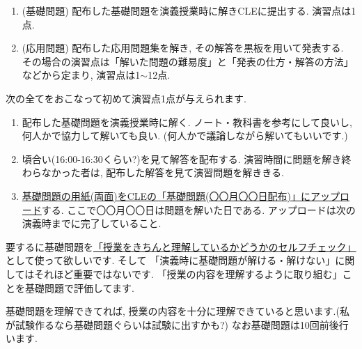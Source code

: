 \documentclass[dvipdfmx,a4paper,11pt]{article}
\theoremstyle{definition}
\begin{document}
\medskip
{}

\begin{enumerate}
  \setlength{\parskip}{0cm} 
  \setlength{\itemsep}{0cm} 
\item (基礎問題) 配布した基礎問題を演義授業時に解きCLEに提出する. 演習点は1点.
\item (応用問題) 配布した応用問題集を解き, その解答を黒板を用いて発表する. その場合の演習点は「解いた問題の難易度」と「発表の仕方・解答の方法」などから定まり, 演習点は1$\sim$12点. 
\end{enumerate}



\medskip
{}

次の全てをおこなって初めて演習点1点が与えられます. 
\begin{enumerate}[label=\textbf{手順}\arabic*.]
  \setlength{\parskip}{0cm} 
  \setlength{\itemsep}{0cm} 
  \item 配布した基礎問題を演義授業時に解く. ノート・教科書を参考にして良いし, 何人かで協力して解いても良い. (何人かで議論しながら解いてもいいです.)
\item 頃合い(16:00-16:30くらい?)を見て解答を配布する. 演習時間に問題を解き終わらなかった者は, 配布した解答を見て演習問題を解ききる. 
 \item \underline{基礎問題の用紙(両面)をCLEの「基礎問題(〇〇月〇〇日配布)」にアップロード}する. ここで〇〇月〇〇日は問題を解いた日である. アップロードは次の演義時までに完了していること.
 \end{enumerate}
 要するに基礎問題を\underline{「授業をきちんと理解しているかどうかのセルフチェック」}として使って欲しいです. 
そして 「演義時に基礎問題が解ける・解けない」に関してはそれほど重要ではないです.
「授業の内容を理解するように取り組む」ことを基礎問題で評価してます. 

基礎問題を理解できてれば, 授業の内容を十分に理解できていると思います.(私が試験作るなら基礎問題ぐらいは試験に出すかも?)
 なお基礎問題は10回前後行います. %
\end{document}
